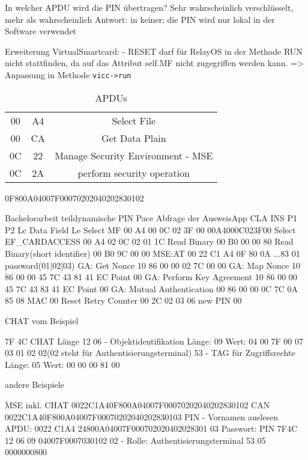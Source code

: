 \documentclass[toc=flat,fontsize=11pt,a4paper,titlepage,headsepline,numbers=noenddot, bibliography=totoc]{scrartcl}
\begin{document}
In welcher APDU wird die PIN übertragen?
Sehr wahrscheinlich verschlüsselt, mehr als wahrscheinlich
Antwort: in keiner; die PIN wird nur lokal in der Software verwendet


Erweiterung VirtualSmartcard:
- RESET darf für RelayOS in der Methode RUN nicht stattfinden, da auf das Attribut self.MF
	nicht zugegriffen werden kann. => Anpassung in Methode \verb+vicc->run+

\begin{table}[h] %
 \caption{APDUs}
 \begin{tabular}{ccc}
  00 & A4 & Select File \\
  00 & CA & Get Data Plain\\
  0C & 22 & Manage Security Environment - MSE\\
  0C & 2A & perform security operation
 \end{tabular}
 \label{tab:meinetabelle}
 \end{table}
 0F800A04007F00070202040202830102
 
 Bachelorarbeit teildynamische PIN
 Pace
 Abfrage der AusweisApp        CLA INS P1 P2 Lc Data Field              Le
Select MF                     00   A4 00 0C 02 3F 00
00A4000C023F00
Select EF_CARDACCESS          00   A4 02 0C 02 01 1C
Read Binary                   00   B0 00 00                            80
Read Binary(short identifier)  00  B0 9C 00                            00
MSE:AT                        00   22 C1 A4 0F 80 0A ...83 01 password(01|02|03)
GA: Get Nonce                  10  86 00 00 02 7C 00                   00
GA: Map Nonce                  10  86 00 00 45 7C 43 81 41 EC Point    00
GA: Perform Key Agreement      10  86 00 00 45 7C 43 83 41 EC Point    00
GA: Mutual Authentication      00  86 00 00 0C 7C 0A 85 08 MAC         00
Reset Retry Counter           00   2C 02 03 06 new PIN                 00

CHAT vom Beispiel 

7F 4C CHAT Länge 12 
06 - Objektidentifikation  Länge: 09 Wert: 04 00 7F 00 07 03 01 02 02(02 steht für Authentisierungsterminal) 
53 - TAG für Zugriffsrechte Länge: 05 Wert:  00 00 00 81 00

andere Beispiele

MSE inkl. CHAT
0022C1A40F800A04007F00070202040202830102 CAN
0022C1A40F800A04007F00070202040202830103 PIN
- Vornamen auslesen 
APDU: 0022
		C1A4
			24800A04007F000702020402028301 03 Passwort: PIN
		7F4C
			12
			06 09 04007F0007030102 02 - Rolle: Authentisierungsterminal
			53 05 0000000800
			
\end{document}
